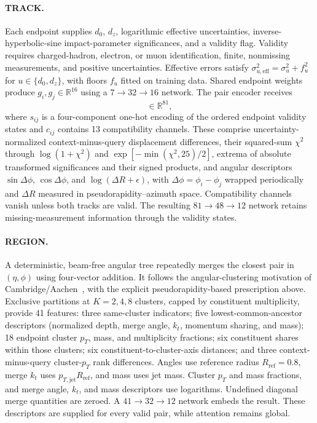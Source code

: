 \paragraph{TRACK.}
Each endpoint supplies $d_0$, $d_z$, logarithmic effective uncertainties, inverse-hyperbolic-sine impact-parameter significances, and a validity flag. Validity requires charged-hadron, electron, or muon identification, finite, nonmissing measurements, and positive uncertainties. Effective errors satisfy $\sigma_{u,\mathrm{eff}}^2=\sigma_u^2+f_u^2$ for $u\in\{d_0,d_z\}$, with floors $f_u$ fitted on training data. Shared endpoint weights produce $g_i,g_j\in\mathbb R^{16}$ using a $7\!\to\!32\!\to\!16$ network. The pair encoder receives
\begin{equation}
 [g_i,g_j,g_j-g_i,g_i\odot g_j,s_{ij},c_{ij}]\in\mathbb R^{81},
 \label{eq:track-pairs}
\end{equation}
where $s_{ij}$ is a four-component one-hot encoding of the ordered endpoint
validity states and $c_{ij}$ contains 13 compatibility channels. These comprise
uncertainty-normalized context-minus-query displacement differences, their
squared-sum $\chi^2$ through $\log(1+\chi^2)$ and
$\exp[-\min(\chi^2,25)/2]$, extrema of absolute transformed significances and
their signed products, and angular descriptors $\sin\Delta\phi$,
$\cos\Delta\phi$, and $\log(\Delta R+\epsilon)$, with
$\Delta\phi=\phi_i-\phi_j$ wrapped periodically and $\Delta R$ measured in
pseudorapidity--azimuth space. Compatibility channels vanish unless both
tracks are valid. The resulting $81\!\to\!48\!\to\!12$ network retains
missing-measurement information through the validity states.

\paragraph{REGION.}
A deterministic, beam-free angular tree repeatedly merges the closest pair in $(\eta,\phi)$ using four-vector addition. It follows the angular-clustering motivation of Cambridge/Aachen~\cite{Dokshitzer1997Cambridge,Wobisch1999Cambridge}, with the explicit pseudorapidity-based prescription above. Exclusive partitions at $K=2,4,8$ clusters, capped by constituent multiplicity, provide 41 features: three same-cluster indicators; five lowest-common-ancestor descriptors (normalized depth, merge angle, $k_t$, momentum sharing, and mass); 18 endpoint cluster $p_T$, mass, and multiplicity fractions; six constituent shares within those clusters; six constituent-to-cluster-axis distances; and three context-minus-query cluster-$p_T$ rank differences. Angles use reference radius $R_{\mathrm{ref}}=0.8$, merge $k_t$ uses $p_{T,\mathrm{jet}}R_{\mathrm{ref}}$, and mass uses jet mass. Cluster $p_T$ and mass fractions, and merge angle, $k_t$, and mass descriptors use logarithms. Undefined diagonal merge quantities are zeroed. A $41\!\to\!32\!\to\!12$ network embeds the result. These descriptors are supplied for every valid pair, while attention remains global.

